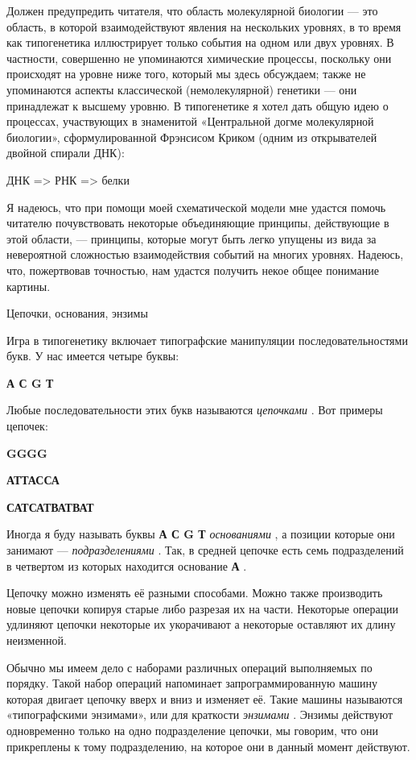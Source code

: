 \documentclass[../main.tex]{subfiles}
\begin{document}
Должен предупредить читателя, что область молекулярной биологии --- это область, в которой взаимодействуют явления на нескольких уровнях, в то время как типогенетика иллюстрирует только события на одном или двух уровнях. В частности, совершенно не упоминаются химические процессы, поскольку они происходят на уровне ниже того, который мы здесь обсуждаем; также не упоминаются аспекты классической (немолекулярной) генетики --- они принадлежат к высшему уровню. В типогенетике я хотел дать общую идею о процессах, участвующих в знаменитой «Центральной догме молекулярной биологии», сформулированной Фрэнсисом Криком (одним из открывателей двойной спирали ДНК):

ДНК =\textgreater{} РНК =\textgreater{} белки

Я надеюсь, что при помощи моей схематической модели мне удастся помочь читателю почувствовать некоторые объединяющие принципы, действующие в этой области, --- принципы, которые могут быть легко упущены из вида за невероятной сложностью взаимодействия событий на многих уровнях. Надеюсь, что, пожертвовав точностью, нам удастся получить некое общее понимание картины.

Цепочки, основания, энзимы

Игра в типогенетику включает типографские манипуляции последовательностями букв. У нас имеется четыре буквы:

\textbf{А С G Т}

Любые последовательности этих букв называются \emph{цепочками} . Вот примеры цепочек:

\textbf{GGGG}

\textbf{АТТАССА}

\textbf{САТСАТВАТВАТ}

Иногда я буду называть буквы \textbf{А С G Т} \emph{основаниями} , а позиции которые они занимают --- \emph{подразделениями} . Так, в средней цепочке есть семь подразделений в четвертом из которых находится основание \textbf{А} .

Цепочку можно изменять её разными способами. Можно также производить новые цепочки копируя старые либо разрезая их на части. Некоторые операции удлиняют цепочки некоторые их укорачивают а некоторые оставляют их длину неизменной.

Обычно мы имеем дело с наборами различных операций выполняемых по порядку. Такой набор операций напоминает запрограммированную машину которая двигает цепочку вверх и вниз и изменяет её. Такие машины называются «типографскими энзимами», или для краткости \emph{энзимами} . Энзимы действуют одновременно только на одно подразделение цепочки, мы говорим, что они прикреплены к тому подразделению, на которое они в данный момент действуют.
\end{document}
